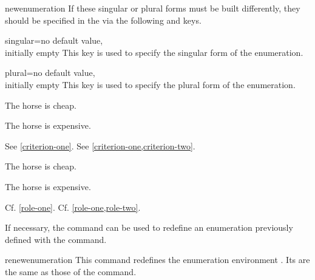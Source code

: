 \documentclass[english,nolocaltoc]{nwejmart}
\newtheorem[style=definition]{fact}
\newtheorem[title-plural=Criteria]{criterion}
\newtheorem[title=random experiment]{rexp}
\begin{document}
\begin{docCommand}[doc new=2019-03-18]{newenumeration}{}
If these singular or plural forms must be built differently,  they
should be specified in the  via
the following  and  keys.
  \begin{docKey}{singular}{={}}{no default value,\\initially empty}
    This key is used to specify the singular form of the enumeration.
  \end{docKey}
  \begin{docKey}{plural}{={}}{no default value,\\initially empty}
    This key is used to specify the plural form of the enumeration.
  \end{docKey}
\begin{preamblecode}
\end{preamblecode}
\begin{bodycode}[listing and text,listing options={deletekeywords={[2]label}}]
\begin{criteria}
\item\label{criterion-one} The horse is cheap.
\item\label{criterion-two} The horse is expensive.
\end{criteria}
See \vref{criterion-one}. See \vref{criterion-one,criterion-two}.
\end{bodycode}

\begin{preamblecode}
\end{preamblecode}
\begin{bodycode}[listing and text,listing options={deletekeywords={[2]label}}]
\begin{roles}
\item\label{role-one} The horse is cheap.
\item\label{role-two} The horse is expensive.
\end{roles}
Cf. \vref{role-one}. Cf. \vref{role-one,role-two}.
\end{bodycode}
%
\end{docCommand}

If necessary, the  command can be used to
redefine an enumeration previously defined with the
 command.

\begin{docCommand}[doc new=2019-03-18]{renewenumeration}{}
  This command redefines the enumeration environment . Its
   are the same as those of the 
   command.
\end{docCommand}
\end{document}
